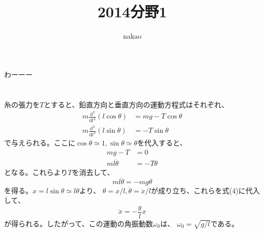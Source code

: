 \documentclass[a4paper]{jsarticle}
\begin{document}
\title{2014分野1}
\author{nakao}
\maketitle

\section{}
わーーー
\section{}
糸の張力を$T$とすると、鉛直方向と垂直方向の運動方程式はそれぞれ、
\begin{align}
  m \frac{\mathrm{d}^2}{\mathrm{d} t^2} (l \cos \theta)
  &= mg - T \cos \theta \\
  m \frac{\mathrm{d}^2}{\mathrm{d} t^2} (l \sin \theta)
  &= - T \sin \theta
\end{align}
で与えられる。ここに$\cos \theta \simeq 1, \sin \theta \simeq \theta$を代入すると、
\begin{align}
  mg - T &= 0 \\
  m l \ddot{\theta} &= -T \theta 
\end{align}
となる。これらより$T$を消去して、
\begin{equation}
  m l \ddot{\theta} = -m g \theta
\end{equation}
を得る。$x = l \sin \theta \simeq l \theta$より、
$\theta = x / l, \ddot{\theta} = \ddot{x} / l$が成り立ち、これらを式(4)に代入して、
\begin{equation}
  \ddot{x} = -\frac{g}{l} x
\end{equation}
が得られる。したがって、この運動の角振動数$\omega_0$は、
$\omega_0 = \sqrt{g/l}$である。
\end{document}
